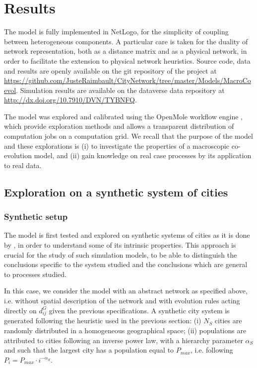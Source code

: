 \documentclass[11pt]{article}
\begin{document}
\section{Results}


The model is fully implemented in NetLogo, for the simplicity of coupling between heterogeneous components. A particular care is taken for the duality of network representation, both as a distance matrix and as a physical network, in order to facilitate the extension to physical network heuristics. Source code, data and results are openly available on the git repository of the project at \url{https://github.com/JusteRaimbault/CityNetwork/tree/master/Models/MacroCoevol}. Simulation results are available on the dataverse data repository at \url{http://dx.doi.org/10.7910/DVN/TYBNFQ}.

The model was explored and calibrated using the OpenMole workflow engine \citep{reuillon2013openmole}, which provide exploration methods and allows a transparent distribution of computation jobs on a computation grid. We recall that the purpose of the model and these explorations is (i) to investigate the properties of a macroscopic co-evolution model, and (ii) gain knowledge on real case processes by its application to real data.



\subsection{Exploration on a synthetic system of cities}

\subsubsection{Synthetic setup}

The model is first tested and explored on synthetic systems of cities as it is done by \cite{favaro2011gibrat}, in order to understand some of its intrinsic properties. This approach is crucial for the study of such simulation models, to be able to distinguish the conclusions specific to the system studied and the conclusions which are general to processes studied.


In this case, we consider the model with an abstract network as specified above, i.e. without spatial description of the network and with evolution rules acting directly on $d^G_{ij}$ given the previous specifications. A synthetic city system is generated following the heuristic used in the previous section: (i) $N_S$ cities are randomly distributed in a homogeneous geographical space; (ii) populations are attributed to cities following an inverse power law, with a hierarchy parameter $\alpha_S$ and such that the largest city has a population equal to $P_{max}$, i.e. following $P_i = P_{max} \cdot i^{-\alpha_S}$.
\end{document}
